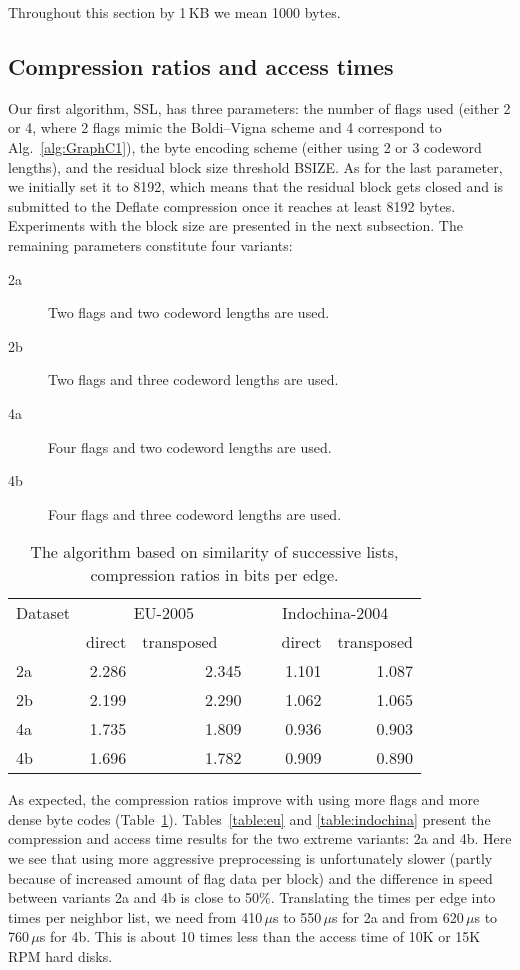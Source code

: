 \documentclass[envcountsame]{llncs}
\begin{document}
Throughout this section by 1\,KB we mean 1000 bytes.


\subsection{Compression ratios and access times}
\label{sec:craat}


Our first algorithm, SSL, has three parameters: the number of flags used (either 2 or 4, 
where 2 flags mimic the Boldi--Vigna scheme and 4 correspond to Alg.~\ref{alg:GraphC1}),
the byte encoding scheme (either using 2 or 3 codeword lengths), and the residual
block size threshold BSIZE. As for the last parameter, we initially set it to 8192, 
which means that the residual block gets closed and is submitted to the Deflate 
compression once it reaches at least 8192 bytes. Experiments with the block size 
are presented in the next subsection. 
The remaining parameters constitute four variants:
\begin{description}
  \item[2a] Two flags and two codeword lengths are used.
  \item[2b] Two flags and three codeword lengths are used.
  \item[4a] Four flags and two codeword lengths are used.
  \item[4b] Four flags and three codeword lengths are used.
\end{description}


\begin{table}
\centering
\begin{tabular}{lrrrr}
\hline
Dataset & \multicolumn{2}{c}{EU-2005} &  \multicolumn{2}{c}{Indochina-2004}  \\
\cline{2-5}
        &  direct & transposed~~~&~~~direct & transposed  \\
\hline
2a & 2.286 & 2.345 & 1.101 & 1.087 \\
2b & 2.199 & 2.290 & 1.062 & 1.065 \\
4a & 1.735 & 1.809 & 0.936 & 0.903 \\
4b & 1.696 & 1.782 & 0.909 & 0.890 \\
\hline
\end{tabular}
\vspace{4mm}
\caption{The algorithm based on similarity of successive lists, compression ratios in bits per edge.}
\label{table:ratios}
\end{table}


As expected, the compression ratios improve with using more flags and more dense 
byte codes (Table~\ref{table:ratios}).
Tables~\ref{table:eu} and \ref{table:indochina} present the compression 
and access time results for the two extreme variants: 2a and 4b.
Here we see that using more aggressive preprocessing is unfortunately slower 
(partly because of increased amount of flag data per block)
and the difference in speed between variants 2a and 4b is close to 50\%. 
Translating the times per edge into times per neighbor list, we need from 
410\,$\mu$s to 550\,$\mu$s for 2a and from 620\,$\mu$s to 760\,$\mu$s for 4b. 
This is about 10 times less than the access time of 10K or 15K RPM hard disks.
\end{document}
